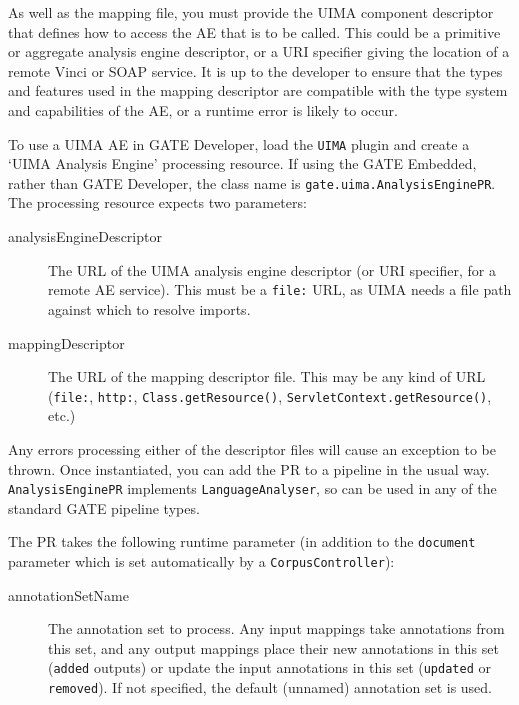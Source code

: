 
As well as the mapping file, you must provide the UIMA component descriptor
that defines how to access the AE that is to be called.  This could be a
primitive or aggregate analysis engine descriptor, or a URI specifier giving
the location of a remote Vinci or SOAP service.  It is up to the developer to
ensure that the types and features used in the mapping descriptor are
compatible with the type system and capabilities of the AE, or a runtime error
is likely to occur.


To use a UIMA AE in GATE Developer, load the \texttt{UIMA} plugin and
create a `UIMA Analysis Engine' processing resource.  If using the
GATE Embedded, rather than GATE Developer, the class name
is \texttt{gate.uima.AnalysisEnginePR}.  The processing resource
expects two parameters:
\begin{description}
\item[analysisEngineDescriptor] The URL of the UIMA analysis engine descriptor
(or URI specifier, for a remote AE service).  This must be a \texttt{file:}
URL, as UIMA needs a file path against which to resolve imports.
\item[mappingDescriptor] The URL of the mapping descriptor file.  This may be
any kind of URL (\texttt{file:}, \texttt{http:}, \texttt{Class.getResource()},
\texttt{ServletContext.getResource()}, etc.)
\end{description}
%
Any errors processing either of the descriptor files will cause an exception to
be thrown.  Once instantiated, you can add the PR to a pipeline in the usual
way.  \texttt{AnalysisEnginePR} implements \texttt{LanguageAnalyser}, so can be
used in any of the standard GATE pipeline types.

The PR takes the following runtime parameter (in addition to the
\texttt{document} parameter which is set automatically by a
\texttt{CorpusController}):
\begin{description}
\item[annotationSetName] The annotation set to process.  Any input mappings
take annotations from this set, and any output mappings place their new
annotations in this set (\texttt{added} outputs) or update the input
annotations in this set (\texttt{updated} or \texttt{removed}).  If not
specified, the default (unnamed) annotation set is used.
\end{description}

